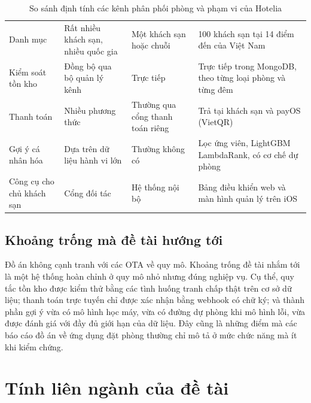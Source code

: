 \begin{table}[H]
\centering
\caption{So sánh định tính các kênh phân phối phòng và phạm vi của Hotelia}\label{tab:channels}
\begin{rtable}
\begin{tabular}{|L{3.4cm}|L{3.6cm}|L{3.6cm}|L{4.0cm}|}
\hline
{} &  &  &  \\ \hline
Danh mục & Rất nhiều khách sạn, nhiều quốc gia & Một khách sạn hoặc chuỗi & 100 khách sạn tại 14 điểm đến của Việt Nam \\ \hline
Kiểm soát tồn kho & Đồng bộ qua bộ quản lý kênh & Trực tiếp & Trực tiếp trong MongoDB, theo từng loại phòng và từng đêm \\ \hline
Thanh toán & Nhiều phương thức & Thường qua cổng thanh toán riêng & Trả tại khách sạn và payOS (VietQR) \\ \hline
Gợi ý cá nhân hóa & Dựa trên dữ liệu hành vi lớn & Thường không có & Lọc ứng viên, LightGBM LambdaRank, có cơ chế dự phòng \\ \hline
Công cụ cho chủ khách sạn & Cổng đối tác & Hệ thống nội bộ & Bảng điều khiển web và màn hình quản lý trên iOS \\ \hline
\end{tabular}
\end{rtable}
\end{table}

\subsection{Khoảng trống mà đề tài hướng tới}

Đồ án không cạnh tranh với các OTA về quy mô. Khoảng trống đề tài nhắm tới là một hệ thống hoàn chỉnh ở quy mô nhỏ nhưng đúng nghiệp vụ. Cụ thể, quy tắc tồn kho được kiểm thử bằng các tình huống tranh chấp thật trên cơ sở dữ liệu; thanh toán trực tuyến chỉ được xác nhận bằng webhook có chữ ký; và thành phần gợi ý vừa có mô hình học máy, vừa có đường dự phòng khi mô hình lỗi, vừa được đánh giá với đầy đủ giới hạn của dữ liệu. Đây cũng là những điểm mà các báo cáo đồ án về ứng dụng đặt phòng thường chỉ mô tả ở mức chức năng mà ít khi kiểm chứng.

\section{Tính liên ngành của đề tài}\label{sec:interdisciplinary}

